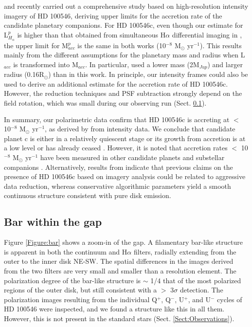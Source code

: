 \documentclass{aa}
\begin{document}
\citet{Rameau17} and \citet{Follette17} recently carried out a comprehensive study based on high-resolution intensity imagery of HD 100546, deriving upper limits for the accretion rate of the candidate planetary companions. For HD 100546c, even though our estimate for L$_{H_{\alpha}}^p$ is higher than that obtained from simultaneous H$\alpha$ differential imaging in \citet{Follette17}, the upper limit for M$_{acc}^p$ is the same in both works (10$^{-8}$ M$_{\odot}$ yr$^{-1}$). This results mainly from the different assumptions for the planetary mass and radius when L$_{acc}$ is transformed into M$_{acc}$. In particular, \citet{Follette17} used a lower mass (2M$_{Jup}$) and larger radius (0.16R$_\odot$) than in this work. In principle, our intensity frames could also be used to derive an additional estimate for the accretion rate of HD 100546c. However, the reduction techniques and PSF subtraction strongly depend on the field rotation, which was small during our observing run (Sect. \ref{Sect:bar}).

In summary, our polarimetric data confirm that HD 100546c is accreting at $<$ 10$^{-8}$ M$_{\odot}$ yr$^{-1}$, as derived by \citet{Follette17} from intensity data. We conclude that candidate planet c is either in a relatively quiescent stage or its growth from accretion is at a low level or has already ceased \citep{Pinilla15}. However, it is noted that accretion rates $<$ 10$^{-8}$ M$_{\odot}$ yr$^{-1}$ have been measured in other candidate planets and substellar companions \citep{Bowler14,Zhou14,Sallum15}. Alternatively, results from \citet{Follette17} indicate that previous claims on the presence of HD 100546c based on imagery analysis could be related to aggressive data reduction, whereas conservative algorithmic parameters yield a smooth continuous structure consistent with pure disk emission.  

\subsection{Bar within the gap}
\label{Sect:bar}
Figure \ref{Figure:bar} shows a zoom-in of the gap. A filamentary bar-like structure is apparent in both the continuum and H$\alpha$ filters, radially extending from the outer to the inner disk NE-SW. The spatial differences in the images derived from the
two filters are very small and smaller than a resolution element. The polarization degree of the bar-like structure is $\sim$ 1/4 that of the most polarized regions of the outer disk, but still consistent with a $>$ 3$\sigma$ detection. The polarization images resulting from the individual Q$^+$, Q$^-$, U$^+$, and U$^-$ cycles of HD 100546 were inspected, and we found a structure
like this in all them. However, this is not present in the standard stars (Sect. \ref{Sect:Observations}).  
\end{document}
